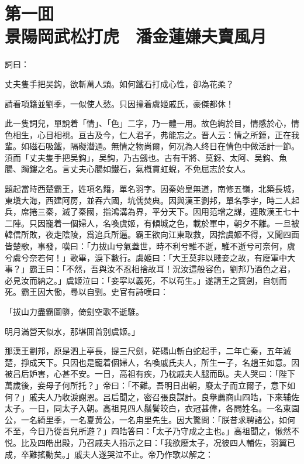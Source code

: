 
\chapter*{第一囬　\\景陽岡武松打虎　潘金蓮嫌夫賣風月}


詞曰：

\begin{myquote}
丈夫隻手把吴鈎，欲斬萬人頭。如何鐵石打成心性，卻為花柔？

請看項籍並劉季，一似使人愁。只因撞着虞姬戚氏，豪傑都休！
\end{myquote}

此一隻詞兒，單說着「情」、「色」二字，乃一體一用。故色絢於目，情感於心，情色相生，心目相視。亘古及今，仁人君子，弗能忘之。晋人云：情之所鍾，正在我輩。如磁石吸鐵，隔礙潛通。無情之物尚爾，何况為人终日在情色中做活計一節。湏而「丈夫隻手把吴鈎」，吴鈎，乃古劔也。古有干將、莫釾、太阿、吴鈎、魚腸、躅鏤之名。言丈夫心腸如鐵石，氣槪貫虹蜺，不免屈志於女人。

題起當時西楚霸王，姓項名籍，單名羽字。因秦始皇無道，南修五嶺，北築長城，東塡大海，西建阿房，並吞六國，坑儒焚典。因與漢王劉邦，單名季字，時二人起兵，席捲三秦，滅了秦國，指鴻溝為界，平分天下。因用范增之謀，連敗漢王七十二陣。只因寵着一個婦人，名喚虞姬，有傾城之色，載於軍中，朝夕不離。一旦被韓信所敗，夜走陰陵，爲追兵所逼。霸王欲向江東取救，因捨虞姬不得，又聞四面皆楚歌，事發，嘆曰：「力拔山兮氣蓋世，時不利兮騅不逝，騅不逝兮可奈何，虞兮虞兮奈若何！」歌畢，淚下數行。虞姬曰：「大王莫非以賤妾之故，有廢軍中大事？」霸王曰：「不然，吾與汝不忍相捨故耳！況汝這般容色，劉邦乃酒色之君，必見汝而納之。」虞姬泣曰：「妾寜以義死，不以苟生。」遂請王之寳劍，自刎而死。霸王因大慟，尋以自剄。史官有詩嘆曰：

\begin{myquote}
「拔山力盡霸圖隳，倚劍空歌不逝騅。

明月滿營天似水，那堪囬首别虞姬。」
\end{myquote}

那漢王劉邦，原是泗上亭長，提三尺劍，硭碭山斬白蛇起手，二年亡秦，五年滅楚，掙成天下。只因也是寵着個婦人，名喚戚氏夫人，所生一子，名趙王如意。因被吕后妒害，心甚不安。一日，高祖有疾，乃枕戚夫人腿而臥。夫人哭曰：「陛下萬歲後，妾母子何所托？」帝曰：「不難。吾明日出朝，廢太子而立爾子，意下如何？」戚夫人乃收淚謝恩。吕后聞之，密召張良謀計。良擧薦商山四皓，下來辅佐太子。一日，同太子入朝。高祖見四人鬚鬢皎白，衣冠甚偉，各問姓名。一名東園公，一名綺里季，一名夏黄公，一名甪里先生。因大驚問：「朕昔求聘諸公，如何不至，今日乃從吾兒所遊？」四皓答曰：「太子乃守成之主也。」高祖聞之，愀然不悦。比及四皓出殿，乃召戚夫人指示之曰：「我欲廢太子，况彼四人輔佐，羽翼已成，卒難搖動矣。」戚夫人遂哭泣不止。帝乃作歌以解之：


